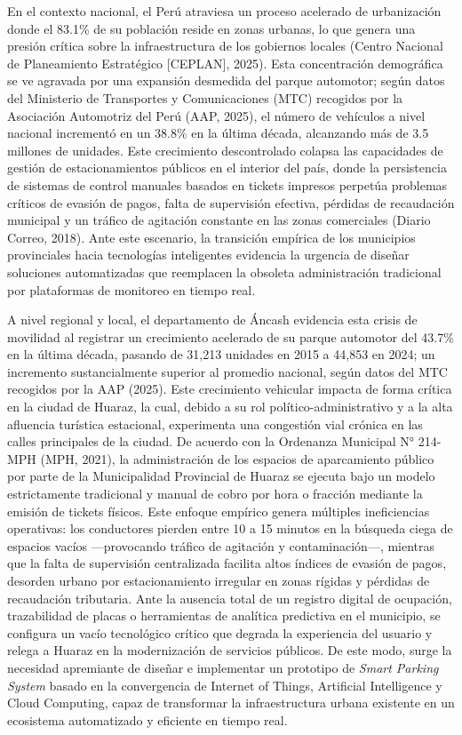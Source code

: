 \documentclass[12pt,a4paper]{article}
\begin{document}
En el contexto nacional, el Perú atraviesa un proceso acelerado de urbanización donde el 83.1\% de su población reside en zonas urbanas, lo que genera una presión crítica sobre la infraestructura de los gobiernos locales (Centro Nacional de Planeamiento Estratégico [CEPLAN], 2025). Esta concentración demográfica se ve agravada por una expansión desmedida del parque automotor; según datos del Ministerio de Transportes y Comunicaciones (MTC) recogidos por la Asociación Automotriz del Perú (AAP, 2025), el número de vehículos a nivel nacional incrementó en un 38.8\% en la última década, alcanzando más de 3.5 millones de unidades. Este crecimiento descontrolado colapsa las capacidades de gestión de estacionamientos públicos en el interior del país, donde la persistencia de sistemas de control manuales basados en tickets impresos perpetúa problemas críticos de evasión de pagos, falta de supervisión efectiva, pérdidas de recaudación municipal y un tráfico de agitación constante en las zonas comerciales (Diario Correo, 2018). Ante este escenario, la transición empírica de los municipios provinciales hacia tecnologías inteligentes evidencia la urgencia de diseñar soluciones automatizadas que reemplacen la obsoleta administración tradicional por plataformas de monitoreo en tiempo real.

A nivel regional y local, el departamento de Áncash evidencia esta crisis de movilidad al registrar un crecimiento acelerado de su parque automotor del 43.7\% en la última década, pasando de 31,213 unidades en 2015 a 44,853 en 2024; un incremento sustancialmente superior al promedio nacional, según datos del MTC recogidos por la AAP (2025). Este crecimiento vehicular impacta de forma crítica en la ciudad de Huaraz, la cual, debido a su rol político-administrativo y a la alta afluencia turística estacional, experimenta una congestión vial crónica en las calles principales de la ciudad. De acuerdo con la Ordenanza Municipal N° 214-MPH (MPH, 2021), la administración de los espacios de aparcamiento público por parte de la Municipalidad Provincial de Huaraz se ejecuta bajo un modelo estrictamente tradicional y manual de cobro por hora o fracción mediante la emisión de tickets físicos. Este enfoque empírico genera múltiples ineficiencias operativas: los conductores pierden entre 10 a 15 minutos en la búsqueda ciega de espacios vacíos —provocando tráfico de agitación y contaminación—, mientras que la falta de supervisión centralizada facilita altos índices de evasión de pagos, desorden urbano por estacionamiento irregular en zonas rígidas y pérdidas de recaudación tributaria. Ante la ausencia total de un registro digital de ocupación, trazabilidad de placas o herramientas de analítica predictiva en el municipio, se configura un vacío tecnológico crítico que degrada la experiencia del usuario y relega a Huaraz en la modernización de servicios públicos. De este modo, surge la necesidad apremiante de diseñar e implementar un prototipo de \textit{Smart Parking System} basado en la convergencia de Internet of Things, Artificial Intelligence y Cloud Computing, capaz de transformar la infraestructura urbana existente en un ecosistema automatizado y eficiente en tiempo real.
\end{document}
